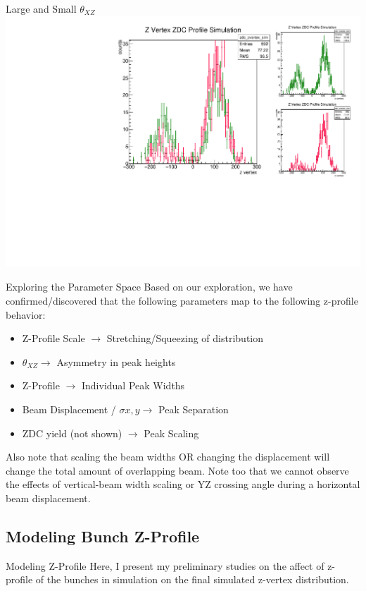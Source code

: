 \begin{frame}{Large and Small $\theta_{XZ}$ }
\includegraphics[width=\linewidth,height=\textheight,keepaspectratio]{../HourglassParameterSpace/figs/xz_angle.pdf}
\end{frame}

\begin{frame}{Exploring the Parameter Space}
Based on our exploration, we have confirmed/discovered that the following
parameters map to the following z-profile behavior:
\begin{itemize}
\item Z-Profile Scale $\rightarrow$ Stretching/Squeezing of distribution
\item $\theta_{XZ} \rightarrow$ Asymmetry in peak heights
\item Z-Profile $\rightarrow$ Individual Peak Widths
\item Beam Displacement / $\sigma{x,y} \rightarrow$ Peak Separation
\item ZDC yield (not shown) $\rightarrow$ Peak Scaling
\end{itemize}

Also note that scaling the beam widths OR changing the displacement will change
the total amount of overlapping beam. Note too that we cannot observe the
effects of vertical-beam width scaling or YZ crossing angle during a horizontal
beam displacement.
\end{frame}


\subsection{Modeling Bunch Z-Profile}
\begin{frame} {Modeling Z-Profile}
Here, I present my preliminary studies on the affect of z-profile of the bunches
in simulation on the final simulated z-vertex distribution.
\end{frame}


